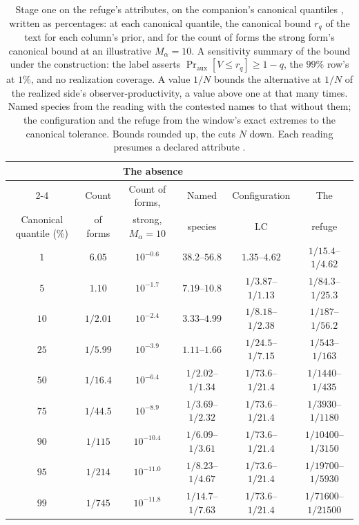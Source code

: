 \documentclass[11pt]{article}
\theoremstyle{definition}
\begin{document}
\begin{table}[ht]
\centering
\small
\caption{Stage one on the refuge's attributes, on the companion's canonical quantiles \cite{Nexus}, written as percentages: at each canonical quantile, the canonical bound $r_q$ of the text for each column's prior, and for the count of forms the strong form's canonical bound at an illustrative $M_\alpha = 10$. A sensitivity summary of the bound under the construction: the label asserts $\Pr_{\mathrm{aux}}[V \le r_q] \ge 1-q$, the $99\%$ row's at $1\%$, and no realization coverage. A value $1/N$ bounds the alternative at $1/N$ of the realized side's observer-productivity, a value above one at that many times. Named species from the reading with the contested names to that without them; the configuration and the refuge from the window's exact extremes to the canonical tolerance. Bounds rounded up, the cuts $N$ down. Each reading presumes a declared attribute \cite{Nexus}.}
\label{tab:hateg-canonical}
\begin{tabular}{@{}cccccc@{}}
\toprule
 & \multicolumn{3}{c}{The absence} & & \\
\cmidrule(lr){2-4}
 & Count & Count of forms, & Named & Configuration & The \\
Canonical quantile (\%) & of forms & strong, $M_\alpha = 10$ & species & $\mathrm{LC}$ & refuge \\
\midrule
$1$ & $6.05$ & $10^{-0.6}$ & $38.2$--$56.8$ & $1.35$--$4.62$ & $1/15.4$--$1/4.62$ \\
$5$ & $1.10$ & $10^{-1.7}$ & $7.19$--$10.8$ & $1/3.87$--$1/1.13$ & $1/84.3$--$1/25.3$ \\
$10$ & $1/2.01$ & $10^{-2.4}$ & $3.33$--$4.99$ & $1/8.18$--$1/2.38$ & $1/187$--$1/56.2$ \\
$25$ & $1/5.99$ & $10^{-3.9}$ & $1.11$--$1.66$ & $1/24.5$--$1/7.15$ & $1/543$--$1/163$ \\
$50$ & $1/16.4$ & $10^{-6.4}$ & $1/2.02$--$1/1.34$ & $1/73.6$--$1/21.4$ & $1/1440$--$1/435$ \\
$75$ & $1/44.5$ & $10^{-8.9}$ & $1/3.69$--$1/2.32$ & $1/73.6$--$1/21.4$ & $1/3930$--$1/1180$ \\
$90$ & $1/115$ & $10^{-10.4}$ & $1/6.09$--$1/3.61$ & $1/73.6$--$1/21.4$ & $1/10400$--$1/3150$ \\
$95$ & $1/214$ & $10^{-11.0}$ & $1/8.23$--$1/4.67$ & $1/73.6$--$1/21.4$ & $1/19700$--$1/5930$ \\
$99$ & $1/745$ & $10^{-11.8}$ & $1/14.7$--$1/7.63$ & $1/73.6$--$1/21.4$ & $1/71600$--$1/21500$ \\
\bottomrule
\end{tabular}
\end{table}
\end{document}

